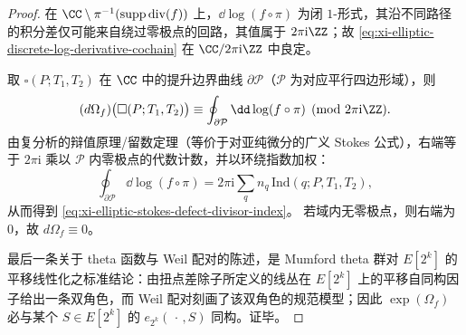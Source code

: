 \begin{proof}
在 \(\CC\setminus\pi^{-1}(\mathrm{supp}\,\mathrm{div}(f))\) 上，\(\dd\log(f\circ\pi)\) 为闭 \(1\)-形式，其沿不同路径的积分差仅可能来自绕过零极点的回路，其值属于 \(2\pi\mathrm{i}\ZZ\)；故 \eqref{eq:xi-elliptic-discrete-log-derivative-cochain} 在 \(\CC/2\pi\mathrm{i}\ZZ\) 中良定。
\par
取 \(\square(P;T_1,T_2)\) 在 \(\CC\) 中的提升边界曲线 \(\partial\mathcal P\)（\(\mathcal P\) 为对应平行四边形域），则
\[
(d\Omega_f)\bigl(\square(P;T_1,T_2)\bigr)\equiv \oint_{\partial\mathcal P}\dd\log(f\circ\pi)\pmod{2\pi\mathrm{i}\ZZ}.
\]
由复分析的辩值原理/留数定理（等价于对亚纯微分的广义 Stokes 公式），右端等于 \(2\pi\mathrm{i}\) 乘以 \(\mathcal P\) 内零极点的代数计数，并以环绕指数加权：
\[
\oint_{\partial\mathcal P}\dd\log(f\circ\pi)
=2\pi\mathrm{i}\sum_q n_q\,\mathrm{Ind}(q;P,T_1,T_2),
\]
从而得到 \eqref{eq:xi-elliptic-stokes-defect-divisor-index}。
若域内无零极点，则右端为 \(0\)，故 \(d\Omega_f\equiv 0\)。
\par
最后一条关于 theta 函数与 Weil 配对的陈述，是 Mumford theta 群对 \(E[2^k]\) 的平移线性化之标准结论：由扭点差除子所定义的线丛在 \(E[2^k]\) 上的平移自同构因子给出一条双角色，而 Weil 配对刻画了该双角色的规范模型；因此 \(\exp(\Omega_f)\) 必与某个 \(S\in E[2^k]\) 的 \(e_{2^k}(\,\cdot\,,S)\) 同构。证毕。
\end{proof}

\endinput
